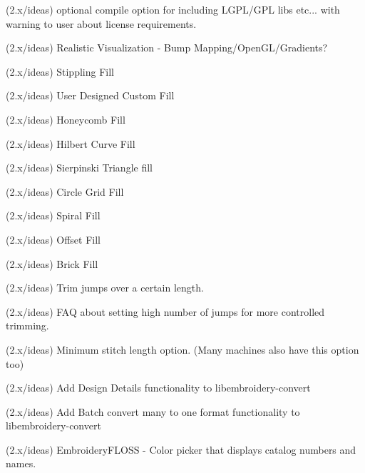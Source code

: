 \begin{DoxyRefList}
\label{todo__todo000325}%
%
(2.\+x/ideas) optional compile option for including LGPL/\+GPL libs etc... with warning to user about license requirements.

\label{todo__todo000326}%
%
(2.\+x/ideas) Realistic Visualization -\/ Bump Mapping/\+Open\+GL/\+Gradients?

\label{todo__todo000327}%
%
(2.\+x/ideas) Stippling Fill

\label{todo__todo000328}%
%
(2.\+x/ideas) User Designed Custom Fill

\label{todo__todo000329}%
%
(2.\+x/ideas) Honeycomb Fill

\label{todo__todo000330}%
%
(2.\+x/ideas) Hilbert Curve Fill

\label{todo__todo000331}%
%
(2.\+x/ideas) Sierpinski Triangle fill

\label{todo__todo000332}%
%
(2.\+x/ideas) Circle Grid Fill

\label{todo__todo000333}%
%
(2.\+x/ideas) Spiral Fill

\label{todo__todo000334}%
%
(2.\+x/ideas) Offset Fill

\label{todo__todo000335}%
%
(2.\+x/ideas) Brick Fill

\label{todo__todo000336}%
%
(2.\+x/ideas) Trim jumps over a certain length.

\label{todo__todo000337}%
%
(2.\+x/ideas) FAQ about setting high number of jumps for more controlled trimming.

\label{todo__todo000338}%
%
(2.\+x/ideas) Minimum stitch length option. (Many machines also have this option too)

\label{todo__todo000339}%
%
(2.\+x/ideas) Add \textquotesingle{}Design Details\textquotesingle{} functionality to libembroidery-\/convert

\label{todo__todo000340}%
%
(2.\+x/ideas) Add \textquotesingle{}Batch convert many to one format\textquotesingle{} functionality to libembroidery-\/convert

\label{todo__todo000341}%
%
(2.\+x/ideas) Embroidery\+FLOSS -\/ Color picker that displays catalog numbers and names.


\end{DoxyRefList}
